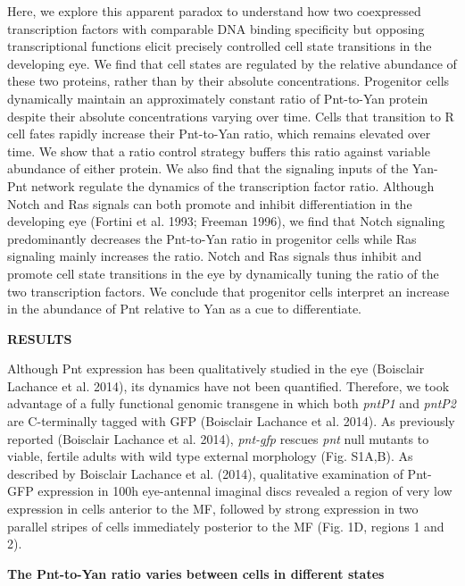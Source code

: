 Here, we explore this apparent paradox to understand how two coexpressed transcription factors with comparable DNA binding specificity but opposing transcriptional functions elicit precisely controlled cell state transitions in the developing eye. We find that cell states are regulated by the relative abundance of these two proteins, rather than by their absolute concentrations. Progenitor cells dynamically maintain an approximately constant ratio of Pnt-to-Yan protein despite their absolute concentrations varying over time. Cells that transition to R cell fates rapidly increase their Pnt-to-Yan ratio, which remains elevated over time. We show that a ratio control strategy buffers this ratio against variable abundance of either protein. We also find that the signaling inputs of the Yan-Pnt network regulate the dynamics of the transcription factor ratio. Although Notch and Ras signals can both promote and inhibit differentiation in the developing eye (Fortini et al. 1993; Freeman 1996), we find that Notch signaling predominantly decreases the Pnt-to-Yan ratio in progenitor cells while Ras signaling mainly increases the ratio. Notch and Ras signals thus inhibit and promote cell state transitions in the eye by dynamically tuning the ratio of the two transcription factors. We conclude that progenitor cells interpret an increase in the abundance of Pnt relative to Yan as a cue to differentiate.

\textbf{RESULTS}

Although Pnt expression has been qualitatively studied in the eye (Boisclair Lachance et al. 2014), its dynamics have not been quantified. Therefore, we took advantage of a fully functional genomic transgene in which both \textit{pntP1} and \textit{pntP2} are C-terminally tagged with GFP (Boisclair Lachance et al. 2014). As previously reported (Boisclair Lachance et al. 2014), \textit{pnt-gfp} rescues \textit{pnt} null mutants to viable, fertile adults with wild type external morphology (Fig. S1A,B). As described by Boisclair Lachance et al. (2014), qualitative examination of Pnt-GFP expression in 100h eye-antennal imaginal discs revealed a region of very low expression in cells anterior to the MF, followed by strong expression in two parallel stripes of cells immediately posterior to the MF (Fig. 1D, regions 1 and 2).

\textbf{The Pnt-to-Yan ratio varies between cells in different states }

